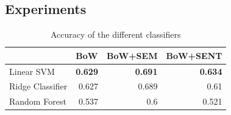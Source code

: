 

\subsection{Experiments}

\begin{table}[]
\centering
\begin{tabular}{l|r|r|r|}
\cline{2-4}
                                       & \multicolumn{1}{l|}{BoW} & \multicolumn{1}{l|}{BoW+SEM} & \multicolumn{1}{l|}{BoW+SENT} \\ \hline
\multicolumn{1}{|l|}{Linear SVM}       & \textbf{0.629}           & \textbf{0.691}               & \textbf{0.634}                \\ \hline
\multicolumn{1}{|l|}{Ridge Classifier} & 0.627                    & 0.689                        & 0.61                          \\ \hline
\multicolumn{1}{|l|}{Random Forest}    & 0.537                    & 0.6                          & 0.521                         \\ \hline
\end{tabular}
\caption{Accuracy of the different classifiers}
\label{tbl:classifiers}
\end{table}

